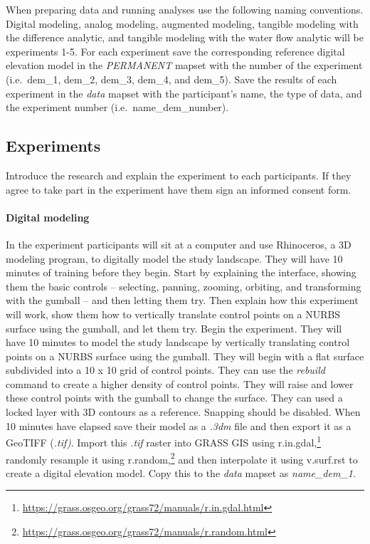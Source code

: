 \documentclass[prodmode,acmtochi]{acmsmall} %
\begin{document}
When preparing data and running analyses use the following naming conventions.
%
Digital modeling,
analog modeling,
augmented modeling,
tangible modeling with the difference analytic,
and tangible modeling with the water flow analytic
will be experiments 1-5.
%
For each experiment 
save the corresponding reference digital elevation model
in the \emph{PERMANENT} mapset 
with the number of the experiment 
(i.e.~dem{\_}1, 
dem{\_}2, 
dem{\_}3, 
dem{\_}4, 
and dem{\_}5).
%
Save the results of each experiment in the \emph{data} mapset
with the participant's name, the type of data, and the experiment number
(i.e.~name{\_}dem{\_}number).

\subsection{Experiments}\label{appendix:experiments}
Introduce the research and explain the experiment to each participants. 
If they agree to take part in the experiment have them sign an informed consent form.
%
\paragraph{Digital modeling}
In the  experiment participants will sit at a computer
and use Rhinoceros, a 3D modeling program, to digitally model
the study landscape. 
They will have 10 minutes of training before they begin.
Start by explaining the interface, 
showing them the basic controls 
-- selecting, panning, zooming, orbiting, and transforming with the gumball --
and then letting them try.
Then explain how this experiment will work, 
show them how to vertically translate control points on a NURBS surface
using the gumball, 
and let them try. 
Begin the experiment. 
They will have 10 minutes to model the study landscape
by vertically translating control points on a NURBS surface
using the gumball.
They will begin with a flat surface 
subdivided into a 10 x 10 grid of control points.
They can use the \emph{rebuild} command 
to create a higher density of control points.
They will raise and lower these control points with the gumball
to change the surface. 
They can used a locked layer with 3D contours as a reference.
Snapping should be disabled.  
%
When 10 minutes have elapsed 
save their model as a \emph{.3dm} file
and then export it as a GeoTIFF (\emph{.tif)}. 
Import this \emph{.tif} raster into GRASS GIS
using r.in.gdal,\footnote{
\url{https://grass.osgeo.org/grass72/manuals/r.in.gdal.html}}
randomly resample it using r.random,\footnote{
\url{https://grass.osgeo.org/grass72/manuals/r.random.html}}
and then interpolate it using v.surf.rst 
to create a digital elevation model.
Copy this to the \emph{data} mapset
as \emph{name{\_}dem{\_}1}.
\end{document}
